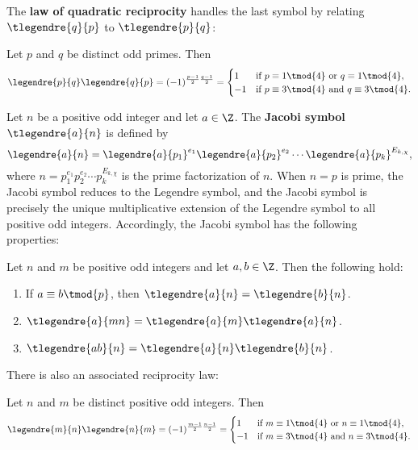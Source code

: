     The \textbf{law of quadratic reciprocity} handles the last symbol by relating $\tlegendre{q}{p}$ to $\tlegendre{p}{q}$:
    \begin{theorem}
      Let $p$ and $q$ be distinct odd primes. Then
      \[
        \legendre{p}{q}\legendre{q}{p} = (-1)^{\frac{p-1}{2}\frac{q-1}{2}} = \begin{cases} 1 & \text{if $p \equiv 1 \tmod{4}$ or $q \equiv 1 \tmod{4}$}, \\ -1 & \text{if $p \equiv 3 \tmod{4}$ and $q \equiv 3 \tmod{4}$}. \end{cases}
      \]
    \end{theorem}
    Let $n$ be a positive odd integer and let $a \in \Z$. The \textbf{Jacobi symbol} $\tlegendre{a}{n}$ is defined by
    \[
      \legendre{a}{n} = \legendre{a}{p_{1}}^{e_{1}}\legendre{a}{p_{2}}^{e_{2}} \cdots \legendre{a}{p_{k}}^{E_{k,\chi}},
    \]
    where $n = p_{1}^{e_{1}}p_{2}^{e_{2}} \cdots p_{k}^{E_{k,\chi}}$ is the prime factorization of $n$. When $n = p$ is prime, the Jacobi symbol reduces to the Legendre symbol, and the Jacobi symbol is precisely the unique multiplicative extension of the Legendre symbol to all positive odd integers. Accordingly, the Jacobi symbol has the following properties:
    \begin{proposition}
      Let $n$ and $m$ be positive odd integers and let $a,b \in \Z$. Then the following hold:
      \begin{enumerate}[label=(\roman*)]
        \item If $a \equiv b \tmod{p}$, then $\tlegendre{a}{n} = \tlegendre{b}{n}$.
        \item $\tlegendre{a}{mn} = \tlegendre{a}{m}\tlegendre{a}{n}$.
        \item $\tlegendre{ab}{n} = \tlegendre{a}{n}\tlegendre{b}{n}$.
      \end{enumerate}
    \end{proposition}
    There is also an associated reciprocity law:
    \begin{proposition}
      Let $n$ and $m$ be distinct positive odd integers. Then
      \[
        \legendre{m}{n}\legendre{n}{m} = (-1)^{\frac{m-1}{2}\frac{n-1}{2}} = \begin{cases} 1 & \text{if $m \equiv 1 \tmod{4}$ or $n \equiv 1 \tmod{4}$}, \\ -1 & \text{if $m \equiv 3 \tmod{4}$ and $n \equiv 3 \tmod{4}$}. \end{cases}
      \]
    \end{proposition}
